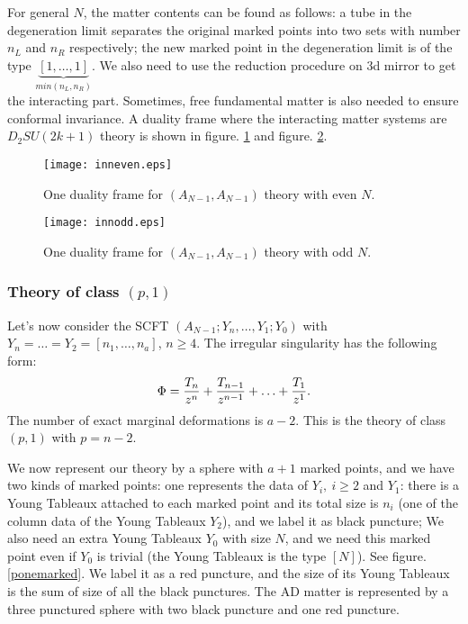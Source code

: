 \documentclass[a4paper,11pt]{article}
\begin{document}
For general $N$, the matter contents can be found as follows: a  
tube in the degeneration limit separates the original marked points into two sets with number $n_L$ and $n_R$ respectively;  the new marked point in the degeneration limit is of the type $\underbrace{[1,\ldots, 1]}_{min(n_L, n_R)}$.
 We also need to use the reduction procedure on 3d mirror to get the interacting part. Sometimes, free fundamental matter is also needed to ensure conformal invariance.
A duality frame where the interacting matter systems  are $D_2 SU(2k+1)$ theory is shown in figure. \ref{aNaNeven} and figure. \ref{aNaNodd}. 
\begin{figure}[h]
\centering
  \texttt{[image: inneven.eps]}
  \caption{One duality frame for $(A_{N-1}, A_{N-1})$ theory with even $N$.}
  \label{aNaNeven}
\end{figure}

\begin{figure}[h]
\centering
  \texttt{[image: innodd.eps]}
  \caption{One duality frame for $(A_{N-1}, A_{N-1})$ theory with odd $N$.}
  \label{aNaNodd}
\end{figure}



\newpage
\subsubsection{Theory of class $(p,1)$}
Let's now consider the SCFT $(A_{N-1}; Y_{n}, \ldots, Y_1; Y_0)$ with $Y_n=\ldots=Y_2=[n_1,\ldots, n_a]$, $n\geq 4$. The irregular singularity has the following form:
\begin{equation}
\Phi={T_n\over z^n}+{T_{n-1}\over z^{n-1}}+\ldots+{T_1\over z^1}.
\end{equation}
The number of exact marginal 
deformations is $a-2$. This is the theory of class $(p,1)$ with $p=n-2$. 


We now represent our theory by a sphere with $a+1$ marked points, and we have two kinds of marked points: one  represents the data of $Y_i,~i\geq2$ and $Y_1$: there 
is a Young Tableaux attached to each marked point and its total size is $n_i$ (one of the column data of the Young Tableaux $Y_2$), and we label it as black puncture;
We also need an extra Young Tableaux $Y_0$ with size $N$, and we need this marked point even if $Y_0$ is trivial (the Young Tableaux is the type $[N]$). See figure. \ref{ponemarked}. 
We label it as a red puncture, and the size of its Young Tableaux is the sum of size of 
all the black punctures. The AD matter is represented by a three punctured sphere with two black puncture and one red puncture.
\end{document}
